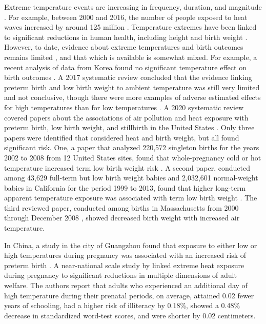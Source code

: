 Extreme temperature events are
increasing in frequency, duration, and magnitude \autocite{world_health_organization_protecting_2018}. For example, between 2000 and 2016, the number of
people exposed to heat waves increased by around 125 million \autocite{world_health_organization_protecting_2018}. Temperature extremes have been linked to significant reductions in human health, including height and birth weight \autocite{deschenes_climate_2009, deschenes_temperature_2014, ogasawara_early-life_2019}. However, to date, evidence about extreme temperatures and birth outcomes remains limited
\autocite{kloog_using_2015, zhang_temperature_2017, basu_temperature_2018}, and
that which is available is somewhat mixed. For example, a recent analysis of data from
Korea found no significant temperature effect on birth outcomes \autocite{cho_ambient_2020}. A 2017 systematic review  concluded that the evidence
linking preterm birth and low birth weight to ambient temperature was
still very limited and not conclusive, though there were more
examples of adverse estimated effects for high temperatures than for low
temperatures \autocite{zhang_temperature_2017}. A 2020 systematic review covered papers about the associations of air pollution and heat
exposure with preterm birth, low birth weight, and stillbirth in the
United States \autocite{bekkar_association_2020}. Only three papers were identified
that considered heat and birth weight, but all found significant risk.
One, a paper that analyzed 220,572 singleton births for the years 2002
to 2008 from 12 United States sites, found that whole-pregnancy cold or hot
temperature increased term low birth weight risk \autocite{ha_ambient_2017}. A
second paper, conducted among 43,629 full-term but low birth weight
babies and 2,032,601 normal-weight babies in California for the period
1999 to 2013, found that higher long-term apparent temperature exposure
was associated with term low birth weight \autocite{basu_temperature_2018}. The third
reviewed paper, conducted among births in Massachusetts from 2000
through December 2008 \autocite{kloog_using_2015}, showed decreased birth weight
with increased air temperature. 

In China, a study in the city of
Guangzhou found that exposure to either low or high temperatures during
pregnancy was associated with an increased risk of preterm birth \autocite{he_ambient_2016}.  A near-national scale study by \textcite{hu_too_2019} linked extreme heat exposure during pregnancy to significant reductions in multiple dimensions of adult welfare. The authors report that adults who experienced an additional day of high temperature during their prenatal periods, on average, attained 0.02 fewer years of schooling, had a higher risk of illiteracy by 0.18\%, showed a 0.48\% decrease in standardized word-test scores, and were shorter by 0.02 centimeters.

